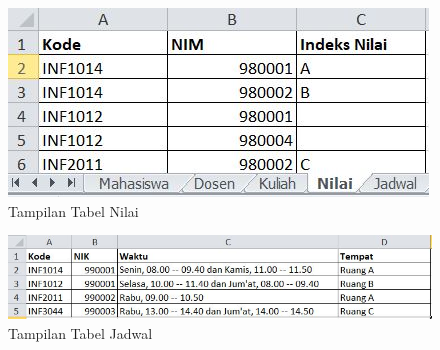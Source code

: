 \begin{enumerate}
    \begin{figure}[!htbp]
    \begin{center}
    \includegraphics[scale=0.9]{section/ica54.JPG}
    \caption{Tampilan Tabel Nilai}
    \end{center}   
    \end{figure} 
    
    \begin{figure}[!htbp]
    \begin{center}
    \includegraphics[scale=0.9]{section/ica55.JPG}
    \caption{Tampilan Tabel Jadwal}
    \end{center}   
    \end{figure} \vspace{3cm}
    

\end{enumerate}
